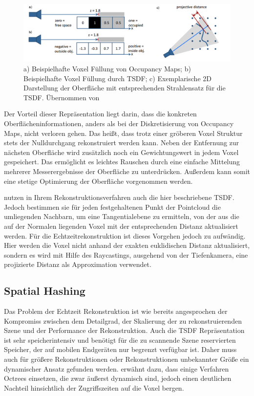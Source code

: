 \begin{figure}
  \centering
	\includegraphics[width=1.0\textwidth]{content/images/methods/tsdf.png} 
  \caption{a) Beispielhafte Voxel Füllung von Occupancy Maps; b) Beispielhafte Voxel Füllung durch TSDF; c) Exemplarische 2D Darstellung der Oberfläche mit entsprechenden Strahlensatz für die TSDF. Übernommen von \citet{Compu66:online}}
  \label{fig:tsdf}
\end{figure}

Der Vorteil dieser Repräsentation liegt darin, dass die konkreten Oberflächeninformationen, anders als bei der Diskretisierung von Occupancy Maps, nicht verloren gehen. Das heißt, dass trotz einer gröberen Voxel Struktur stets der Nulldurchgang rekonstruiert werden kann. Neben der Entfernung zur nächsten Oberfläche wird zusätzlich noch ein Gewichtungswert in jedem Voxel gespeichert. Das ermöglicht es leichtes Rauschen durch eine einfache Mittelung mehrerer Messerergebnisse der Oberfläche zu unterdrücken. Außerdem kann somit eine stetige Optimierung der Oberfläche vorgenommen werden. \citep{Compu66:online}

\citet{hoppe1992surface} nutzen in Ihrem Rekonstruktionsverfahren auch die hier beschriebene TSDF. Jedoch bestimmen sie für jeden festgehaltenen Punkt der Pointcloud die umliegenden Nachbarn, um eine Tangentialebene zu ermitteln, von der aus die auf der Normalen liegenden Voxel mit der entsprechenden Distanz aktualisiert werden. Für die Echtzeitrekonstruktion ist dieses Vorgehen jedoch zu aufwändig. Hier werden die Voxel nicht anhand der exakten euklidischen Distanz aktualisiert, sondern es wird mit Hilfe des Raycastings, ausgehend von der Tiefenkamera, eine projizierte Distanz als Approximation verwendet. \citep{Compu66:online}

\subsection{Spatial Hashing}

Das Problem der Echtzeit Rekonstruktion ist wie bereits angesprochen der Kompromiss zwischen dem Detailgrad, der Skalierung der zu rekonstruierenden Szene und der Performance der Rekonstruktion. Auch die TSDF Repräsentation ist sehr speicherintensiv und benötigt für die zu scannende Szene reservierten Speicher, der auf mobilen Endgeräten nur begrenzt verfügbar ist. Daher muss auch für größere Rekonstruktionen oder Rekonstruktionen unbekannter Größe ein dynamischer Ansatz gefunden werden. \citet{Klingensmith_2015_7924} erwähnt dazu, dass einige Verfahren Octrees einsetzen, die zwar äußerst dynamisch sind, jedoch einen deutlichen Nachteil hinsichtlich der Zugriffszeiten auf die Voxel bergen. 

